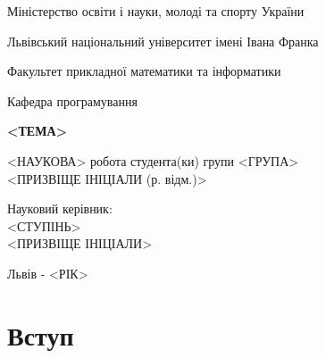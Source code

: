 \documentclass[12pt,a4paper]{article}
\begin{document}

\thispagestyle{empty}
\setlength{\parindent}{1.5cm}
\fontsize{14pt}{6mm}\selectfont

\begin{center}
  Міністерство освіти і науки, молоді та спорту України
  
  Львівський національний університет імені Івана Франка

  Факультет прикладної математики та інформатики
\end{center}

\vspace{1cm}

\begin{flushright}
  Кафедра програмування
\end{flushright}

\vspace{4cm}

\begin{center}
  {\bfseries\Large <ТЕМА>}
\end{center}

\vspace{2cm}

\begin{small}
\begin{flushleft}
  <НАУКОВА> робота студента(ки) групи <ГРУПА>\\
  <ПРИЗВІЩЕ ІНІЦІАЛИ (р. відм.)>\linebreak
  
  Науковий керівник:\\
  <СТУПІНЬ>\\
  <ПРИЗВІЩЕ ІНІЦІАЛИ>
\end{flushleft}
\end{small}

\vspace{4cm}

\begin{center}
  Львів - <РІК> 
\end{center}

\clearpage



\fontsize{14pt}{6mm}\selectfont

\newcommand{\vect}[1]{(#1_1,#1_2,\dots,#1_n)}

\thispagestyle{empty}
\tableofcontents
\clearpage
{}

\section{Вступ}
\end{document}
